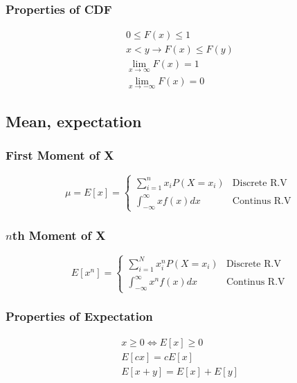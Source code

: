 \documentclass{article}
\begin{document}
    \subsubsection{Properties of CDF}
    \begin{gather}
        0 \leq F(x) \leq 1 \\
        x < y \rightarrow F(x) \leq F(y) \\
        \lim_{x \to \infty} F(x) = 1 \\
        \lim_{x \to -\infty} F(x) = 0
    \end{gather}

    \subsection{Mean, expectation}

    \subsubsection{First Moment of X}
    \begin{equation}
        \mu = E[x] = \left.
            \begin{cases}
                \sum^n_{i=1}x_iP(X=x_i) & \textrm{Discrete R.V} \\
                \int_{-\infty}^{\infty}xf(x)dx & \textrm{Continus R.V}
            \end{cases}
        \right.
    \end{equation}

    \subsubsection{$n$th Moment of X}
    \begin{equation}
        E[x^n] = \left.
            \begin{cases}
                \sum^N_{i=1}x_i^nP(X=x_i) & \textrm{Discrete R.V} \\
                \int_{-\infty}^{\infty}x^nf(x)dx & \textrm{Continus R.V}
            \end{cases}
        \right.
    \end{equation}

    \subsubsection{Properties of Expectation}
    \begin{gather}
        x \geq 0 \iff E[x] \geq 0 \\
        E[cx] = cE[x] \\
        E[x+y] = E[x] + E[y]
    \end{gather}
\end{document}
